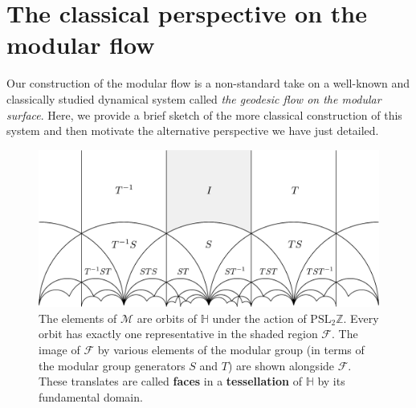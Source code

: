 \documentclass[12pt,twoside]{reedthesis}
\theoremstyle{definition}
\newcommand{\Z}{\mathbb{Z}}
\newcommand{\PSLZ}{\mathrm{PSL}_2{\Z}}
\newcommand{\defnphrase}[1]{\textbf{#1}}
\begin{document}
\section{The classical perspective on the modular flow}

Our construction of the modular flow is a non-standard take on a well-known and classically studied dynamical system called \emph{the geodesic flow on the modular surface}.
Here, we provide a brief sketch of the more classical construction of this system and then motivate the alternative perspective we have just detailed.

\begin{figure}[b!]
  \centering
  \includegraphics[width=0.8\linewidth]{figures/tessellation.pdf}
  \caption{The elements of $\mathcal{M}$ are orbits of $\mathbb{H}$ under the action of $\PSLZ$. Every orbit has exactly one representative in the shaded region $\mathcal{F}$. The image of $\mathcal{F}$ by various elements of the modular group (in terms of the modular group generators $S$ and $T$) are shown alongside $\mathcal{F}$. These translates are called \defnphrase{faces} in a \defnphrase{tessellation} of $\mathbb{H}$ by its fundamental domain.}
  \label{fig:tessellation}
\end{figure}
\end{document}

